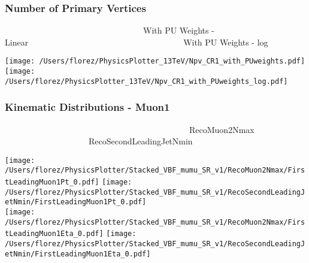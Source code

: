 \documentclass{beamer}
\begin{document}
\begin{frame}
\frametitle{Number of Primary Vertices}
\tiny{~~~~~~~~~~~~~~~~~~~~~~~~~~~~~~~~~With PU Weights - Linear~~~~~~~~~~~~~~~~~~~~~~~~~~~~~~~~~~~~~With PU Weights - log}\\
\begin{center}
 
   \texttt{[image: /Users/florez/PhysicsPlotter\_13TeV/Npv\_CR1\_with\_PUweights.pdf]}
  \texttt{[image: /Users/florez/PhysicsPlotter\_13TeV/Npv\_CR1\_with\_PUweights\_log.pdf]}
  
 
\end{center}

\end{frame}


\begin{frame}
\frametitle{Kinematic Distributions - Muon1}
\tiny{~~~~~~~~~~~~~~~~~~~~~~~~~~~~~~~~~~~~~~~~~~~~RecoMuon2Nmax~~~~~~~~~~~~~~~~~~~~~~~~~~~~~~~~RecoSecondLeadingJetNmin}\\
\begin{center}
 
   \texttt{[image: /Users/florez/PhysicsPlotter/Stacked\_VBF\_mumu\_SR\_v1/RecoMuon2Nmax/FirstLeadingMuon1Pt\_0.pdf]}
  \texttt{[image: /Users/florez/PhysicsPlotter/Stacked\_VBF\_mumu\_SR\_v1/RecoSecondLeadingJetNmin/FirstLeadingMuon1Pt\_0.pdf]}\\
  
 
   \texttt{[image: /Users/florez/PhysicsPlotter/Stacked\_VBF\_mumu\_SR\_v1/RecoMuon2Nmax/FirstLeadingMuon1Eta\_0.pdf]}
  \texttt{[image: /Users/florez/PhysicsPlotter/Stacked\_VBF\_mumu\_SR\_v1/RecoSecondLeadingJetNmin/FirstLeadingMuon1Eta\_0.pdf]}\\
 
\end{center}

\end{frame}
\end{document}
